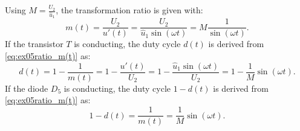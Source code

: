 \begin{solutionblock}
    Using $M = \frac{U_{\mathrm{2}}}{\hat u_{\mathrm{1}}}$, the transformation ratio is given with:
    \begin{equation}
        m(t) = \frac{U_{\mathrm{2}}}{u'(t)}=\frac{U_{\mathrm{2}}}{\hat u_{\mathrm{1}} \sin(\omega t)} = M \frac{1}{\sin(\omega t)}.
    \end{equation}
   If the transistor $T$ is conducting, the duty cycle $d(t)$ is derived from \eqref{eq:ex05ratio_m(t)} as:
\begin{equation}
    d(t) = 1-\frac{1}{m(t)} = 1- \frac{u'(t)}{U_{\mathrm{2}}}=1- \frac{\hat u_{\mathrm{1}}\sin(\omega t)}{U_{\mathrm{2}}} = 1 -\frac{1}{M} \sin(\omega t).
\end{equation}
If the diode $D_{\mathrm{5}}$ is conducting, the duty cycle $1-d(t)$ is derived from \eqref{eq:ex05ratio_m(t)} as:
\begin{equation}
    1-d(t) = \frac{1}{m(t)}=\frac{1}{M} \sin(\omega t).
\end{equation}
\end{solutionblock}

